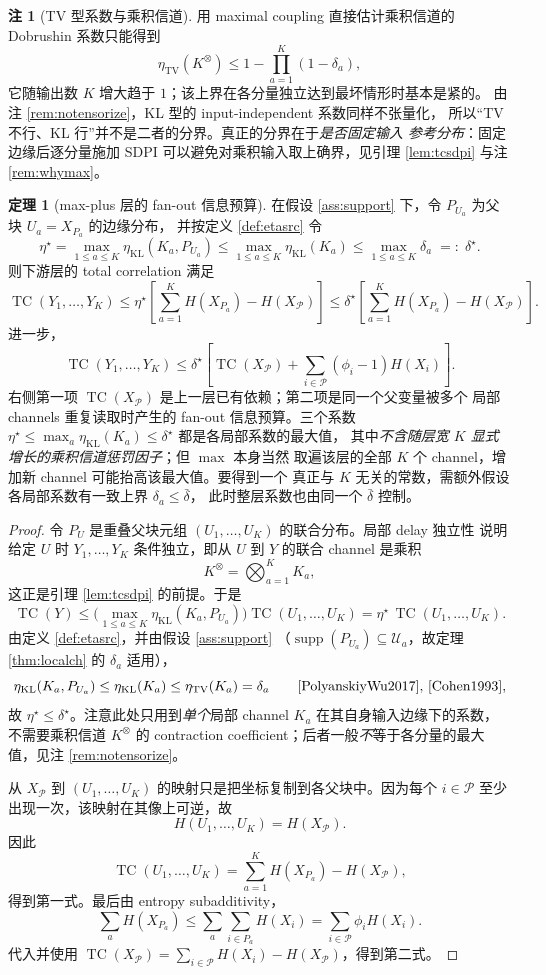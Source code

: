 \documentclass[a4paper,11pt]{article}
\theoremstyle{definition}
\newtheorem{theorem}{定理}
\newtheorem{remark}{注}
\newcommand{\1}{\mathbf 1}
\newcommand{\TV}{\mathrm{TV}}
\newcommand{\KL}{\mathrm{KL}}
\newcommand{\supp}{\operatorname{supp}}
\newcommand{\TC}{\operatorname{TC}}
\newcommand{\Kprod}{K^{\otimes}}
\newcommand{\Pset}{\mathcal P}
\begin{document}
\begin{remark}[TV 型系数与乘积信道]
\label{rem:tvnotensor}
用 maximal coupling 直接估计乘积信道的 Dobrushin 系数只能得到
\[
\eta_{\TV}(\Kprod)\le1-\prod_{a=1}^{K}(1-\delta_a),
\]
它随输出数 $K$ 增大趋于 $1$；该上界在各分量独立达到最坏情形时基本是紧的。
由注 \ref{rem:notensorize}，KL 型的 input-independent 系数同样不张量化，
所以“TV 不行、KL 行”并不是二者的分界。真正的分界在于\emph{是否固定输入
参考分布}：固定边缘后逐分量施加 SDPI 可以避免对乘积输入取上确界，见引理
\ref{lem:tcsdpi} 与注 \ref{rem:whymax}。
\end{remark}

\begin{theorem}[max-plus 层的 fan-out 信息预算]
\label{thm:fanout}
在假设 \ref{ass:support} 下，令 $P_{U_a}$ 为父块 $U_a=X_{P_a}$ 的边缘分布，
并按定义 \ref{def:etasrc} 令
\[
\eta^{\star}=\max_{1\le a\le K}\eta_{\KL}(K_a,P_{U_a})
\le
\max_{1\le a\le K}\eta_{\KL}(K_a)
\le
\max_{1\le a\le K}\delta_a
\;=:\;\delta^\star .
\]
则下游层的 total correlation 满足
\[
\TC(Y_1,\ldots,Y_K)
\le
\eta^{\star}
\left[
\sum_{a=1}^{K}H(X_{P_a})-H(X_{\Pset})
\right]
\le
\delta^\star
\left[
\sum_{a=1}^{K}H(X_{P_a})-H(X_{\Pset})
\right].
\]
进一步，
\[
\TC(Y_1,\ldots,Y_K)
\le
\delta^\star
\left[
\TC(X_{\Pset})
+
\sum_{i\in\Pset}(\phi_i-1)H(X_i)
\right].
\]
右侧第一项 $\TC(X_{\Pset})$ 是上一层已有依赖；第二项是同一个父变量被多个
局部 channels 重复读取时产生的 fan-out 信息预算。三个系数
$\eta^\star\le\max_a\eta_{\KL}(K_a)\le\delta^\star$ 都是各局部系数的最大值，
其中\emph{不含随层宽 $K$ 显式增长的乘积信道惩罚因子}；但 $\max$ 本身当然
取遍该层的全部 $K$ 个 channel，增加新 channel 可能抬高该最大值。要得到一个
真正与 $K$ 无关的常数，需额外假设各局部系数有一致上界 $\delta_a\le\bar\delta$，
此时整层系数也由同一个 $\bar\delta$ 控制。
\end{theorem}

\begin{proof}
令 $P_U$ 是重叠父块元组 $(U_1,\ldots,U_K)$ 的联合分布。局部 delay 独立性
说明给定 $U$ 时 $Y_1,\ldots,Y_K$ 条件独立，即从 $U$ 到 $Y$ 的联合 channel
是乘积
\[
\Kprod=\bigotimes_{a=1}^{K}K_a,
\]
这正是引理 \ref{lem:tcsdpi} 的前提。于是
\[
\TC(Y)
\le
\Big(\max_{1\le a\le K}\eta_{\KL}(K_a,P_{U_a})\Big)\TC(U_1,\ldots,U_K)
=
\eta^\star\,\TC(U_1,\ldots,U_K).
\]
由定义 \ref{def:etasrc}，并由假设 \ref{ass:support}
（$\supp(P_{U_a})\subseteq\mathcal U_a$，故定理 \ref{thm:localch} 的
$\delta_a$ 适用），
\[
\eta_{\KL}(K_a,P_{U_a})\le\eta_{\KL}(K_a)\le\eta_{\TV}(K_a)=\delta_a
\qquad\text{\cite[Theorem 1]{PolyanskiyWu2017}, \cite{Cohen1993}},
\]
故 $\eta^\star\le\delta^\star$。注意此处只用到\emph{单个}局部 channel
$K_a$ 在其自身输入边缘下的系数，不需要乘积信道 $\Kprod$ 的 contraction
coefficient；后者一般\emph{不}等于各分量的最大值，见注
\ref{rem:notensorize}。

从 $X_{\Pset}$ 到 $(U_1,\ldots,U_K)$ 的映射只是把坐标复制到各父块中。因为每个
$i\in\Pset$ 至少出现一次，该映射在其像上可逆，故
\[
H(U_1,\ldots,U_K)=H(X_{\Pset}).
\]
因此
\[
\TC(U_1,\ldots,U_K)
=
\sum_{a=1}^{K}H(X_{P_a})-H(X_{\Pset}),
\]
得到第一式。最后由 entropy subadditivity，
\[
\sum_aH(X_{P_a})
\le
\sum_a\sum_{i\in P_a}H(X_i)
=
\sum_{i\in\Pset}\phi_iH(X_i).
\]
代入并使用
$\TC(X_{\Pset})=\sum_{i\in\Pset}H(X_i)-H(X_{\Pset})$，得到第二式。
\end{proof}
\end{document}
